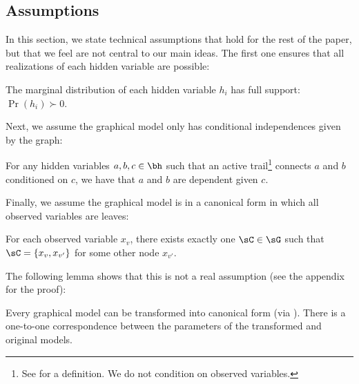 %
%

\subsection{Assumptions}

In this section, we state technical assumptions that hold for the rest of the
paper, but that we feel are not central to our main ideas.
The first one ensures that all realizations of each hidden variable are possible:

\begin{assumption}
  \label{asm:non-degeneracy}
  The marginal distribution of each hidden variable $h_i$ has full support: $\Pr(h_i) \succ 0$.
\end{assumption}

Next, we assume the graphical model only has conditional independences given by
the graph:
\begin{assumption}[Faithful]
  \label{asm:faithful}  
  For any hidden variables $a,b,c \in \bh$
  such that an active trail\footnote{See
  \citet{koller2009probabilistic} for a definition.
  We do not condition on observed variables.} connects $a$ and $b$ conditioned on $c$,
  we have that $a$ and $b$ are dependent given $c$. %
\end{assumption}

Finally, we assume the graphical model is in a canonical form
in which all observed variables are leaves:
\begin{assumption}
  \label{asm:canonical}
  For each observed variable $x_v$, there exists exactly one $\sC \in \sG$
  such that $\sC = \{ x_v, x_{v'} \}$ for some other node $x_{v'}$.
\end{assumption}
The following lemma shows that this is not a real assumption (see the appendix for the proof):
\begin{lemma}
\label{lem:reduction}
Every graphical model can be transformed into canonical
form (via ).
There is a one-to-one correspondence between the parameters of the transformed
and original models.
\end{lemma}

